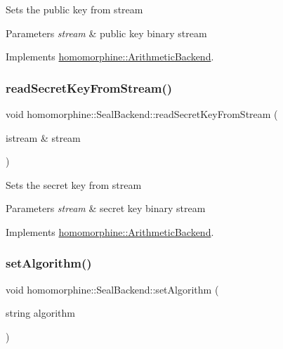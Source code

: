 Sets the public key from stream


\begin{DoxyParams}{Parameters}
{\em stream} & public key binary stream \\
\hline
\end{DoxyParams}


Implements \hyperlink{classhomomorphine_1_1_arithmetic_backend_aab5aac202ce0911e99e8adce7ffb707a}{homomorphine\+::\+Arithmetic\+Backend}.

\mbox{\label{classhomomorphine_1_1_seal_backend_a5c1607bb712ff2776f4d4ca0c75b3e37}} 
\subsubsection{\texorpdfstring{read\+Secret\+Key\+From\+Stream()}{readSecretKeyFromStream()}}
{\footnotesize\ttfamily void homomorphine\+::\+Seal\+Backend\+::read\+Secret\+Key\+From\+Stream (\begin{DoxyParamCaption}\item[{istream \&}]{stream }\end{DoxyParamCaption})\hspace{0.3cm}{\ttfamily [virtual]}}

Sets the secret key from stream


\begin{DoxyParams}{Parameters}
{\em stream} & secret key binary stream \\
\hline
\end{DoxyParams}


Implements \hyperlink{classhomomorphine_1_1_arithmetic_backend_a69b65cd979de00a9afa0c38c3b4329b0}{homomorphine\+::\+Arithmetic\+Backend}.

\mbox{\label{classhomomorphine_1_1_seal_backend_a46a336bca80c5450a1f3ea1125d0d0e8}} 
\subsubsection{\texorpdfstring{set\+Algorithm()}{setAlgorithm()}\hspace{0.1cm}{\footnotesize\ttfamily [1/2]}}
{\footnotesize\ttfamily void homomorphine\+::\+Seal\+Backend\+::set\+Algorithm (\begin{DoxyParamCaption}\item[{string}]{algorithm }\end{DoxyParamCaption})\hspace{0.3cm}{\ttfamily [virtual]}}

